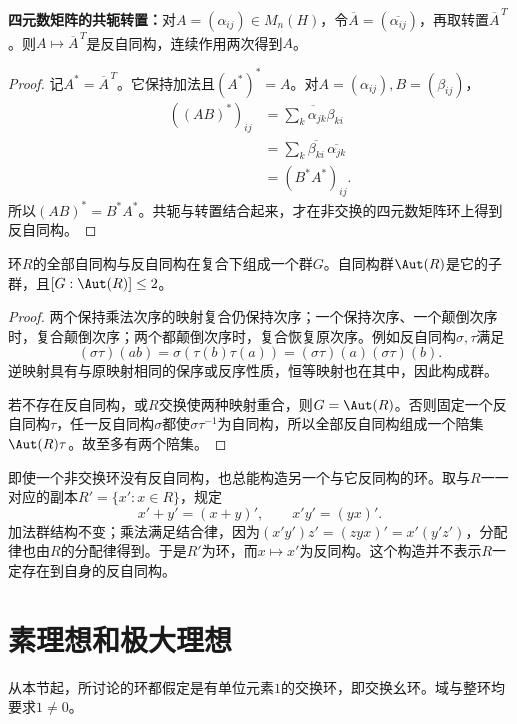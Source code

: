 \begin{example}
\textbf{四元数矩阵的共轭转置：}对$A=(\alpha_{ij})\in M_n(H)$，令$\overline A=(\overline{\alpha_{ij}})$，再取转置$\overline A^{\,T}$。则$A\mapsto\overline A^{\,T}$是反自同构，连续作用两次得到$A$。
\end{example}
\begin{proof}
记$A^*=\overline A^{\,T}$。它保持加法且$(A^*)^*=A$。对$A=(\alpha_{ij}),B=(\beta_{ij})$，
\begin{align*}
((AB)^*)_{ij}
&=\overline{\sum_k\alpha_{jk}\beta_{ki}}\\
&=\sum_k\overline{\beta_{ki}}\,\overline{\alpha_{jk}}\\
&=(B^*A^*)_{ij}.
\end{align*}
所以$(AB)^*=B^*A^*$。共轭与转置结合起来，才在非交换的四元数矩阵环上得到反自同构。
\end{proof}

\begin{proposition}
环$R$的全部自同构与反自同构在复合下组成一个群$G$。自同构群$\Aut(R)$是它的子群，且$[G:\Aut(R)]\leq2$。
\end{proposition}
\begin{proof}
两个保持乘法次序的映射复合仍保持次序；一个保持次序、一个颠倒次序时，复合颠倒次序；两个都颠倒次序时，复合恢复原次序。例如反自同构$\sigma,\tau$满足
\[
(\sigma\tau)(ab)=\sigma(\tau(b)\tau(a))
=(\sigma\tau)(a)(\sigma\tau)(b).
\]
逆映射具有与原映射相同的保序或反序性质，恒等映射也在其中，因此构成群。

若不存在反自同构，或$R$交换使两种映射重合，则$G=\Aut(R)$。否则固定一个反自同构$\tau$，任一反自同构$\sigma$都使$\sigma\tau^{-1}$为自同构，所以全部反自同构组成一个陪集$\Aut(R)\tau$。故至多有两个陪集。
\end{proof}

即使一个非交换环没有反自同构，也总能构造另一个与它反同构的环。取与$R$一一对应的副本$R'=\{x':x\in R\}$，规定
\[
x'+y'=(x+y)',\qquad x'y'=(yx)'.
\]
加法群结构不变；乘法满足结合律，因为$(x'y')z'=(zyx)'=x'(y'z')$，分配律也由$R$的分配律得到。于是$R'$为环，而$x\mapsto x'$为反同构。这个构造并不表示$R$一定存在到自身的反自同构。


\section{素理想和极大理想}

从本节起，所讨论的环都假定是有单位元素$1$的交换环，即交换幺环。域与整环均要求$1\ne0$。



